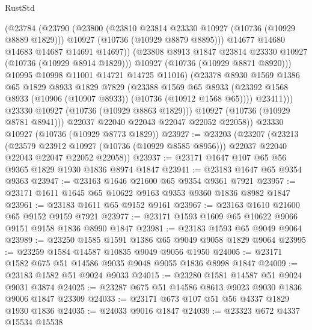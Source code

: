 \begin{lexlean}{RustStd}
\begin{coremodule}
                    (@23784
                      (@23790
                        (@23800
                          (@23810 @23814 @23330 @10927 (@10736 (@10929 @8889 @1829)))
                          @10927
                          (@10736 (@10929 @8879 @8895)))
                        @14677
                        @14680
                        @14683
                        @14687
                        @14691
                        @14697))
                    (@23808 @8913 @1847 @23814 @23330 @10927 (@10736 (@10929 @8914 @1829)))
                    @10927
                    (@10736 (@10929 @8871 @8920)))
                  @10995
                  @10998
                  @11001
                  @14721
                  @14725
                  @11016)
                (@23378
                  @8930
                  @1569
                  @1386
                  @65
                  @1829
                  @8933
                  @1829
                  @7829
                  (@23388
                    @1569
                    @65
                    @8933
                    (@23392 @1568 @8933 (@10906 (@10907 @8933)) (@10736 (@10912 @1568 @65))))
                  @23411)))
            @23330
            @10927
            (@10736 (@10929 @8863 @1829)))
          @10927
          (@10736 (@10929 @8781 @8941)))
        @22037
        @22040
        @22043
        @22047
        @22052
        @22058))
    @23330
    @10927
    (@10736 (@10929 @8773 @1829))
@23927 := @23203
    (@23207
      (@23213
        (@23579 @23912 @10927 (@10736 (@10929 @8585 @8956)))
        @22037
        @22040
        @22043
        @22047
        @22052
        @22058))
@23937 := @23171 @1647 @107 @65 @56 @9365 @1829 @1930 @1836 @8974 @1847
@23941 := @23183 @1647 @65 @9354 @9363
@23947 := @23163 @1646 @21600 @65 @9354 @9361 @7921
@23957 := @23171 @1611 @1645 @65 @10622 @9163 @9353 @9360 @1836 @8982 @1847
@23961 := @23183 @1611 @65 @9152 @9161
@23967 := @23163 @1610 @21600 @65 @9152 @9159 @7921
@23977 := @23171 @1593 @1609 @65 @10622 @9066 @9151 @9158 @1836 @8990 @1847
@23981 := @23183 @1593 @65 @9049 @9064
@23989 := @23250 @1585 @1591 @1386 @65 @9049 @9058 @1829 @9064
@23995 := @23259 @1584 @14587 @10835 @9049 @9056 @1950
@24005 := @23171 @1582 @675 @51 @14586 @9035 @9048 @9055 @1836 @8998 @1847
@24009 := @23183 @1582 @51 @9024 @9033
@24015 := @23280 @1581 @14587 @51 @9024 @9031 @3874
@24025 := @23287 @675 @51 @14586 @8613 @9023 @9030 @1836 @9006 @1847 @23309
@24033 := @23171 @673 @107 @51 @56 @4337 @1829 @1930 @1836
@24035 := @24033 @9016 @1847
@24039 := @23323 @672 @4337 @15534 @15538

\end{coremodule}
\end{lexlean}
